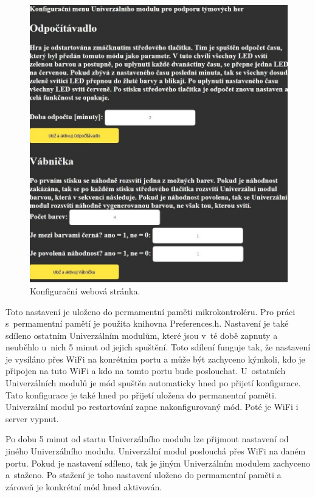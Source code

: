 \begin{figure}[!h]
  \begin{center}
    \includegraphics[scale=0.3]{obrazky/konfiguracni_webova_stranka.jpg}
  \end{center}
  \caption[Konfigurační webová stránka]{Konfigurační webová stránka.}
\end{figure}

Toto nastavení je uloženo do permamentní paměti mikrokontroléru. Pro práci s~permamentní pamětí je použita knihovna Preferences.h. Nastavení je také sdíleno ostatním Univerzálním modulům, které jsou v~té době zapnuty 
a neuběhlo u~nich 5 minut od jejich spuštění. Toto sdílení funguje tak, že nastavení je vysíláno přes WiFi na konrétním portu a může být zachyceno kýmkoli, kdo je připojen na tuto WiFi a kdo na tomto portu bude 
poslouchat. U~ostatních Univerzálních modulů je mód spuštěn automaticky hned po přijetí konfigurace. Tato konfigurace je také hned po přijetí uložena do permanentní paměti. Univerzální modul po restartování zapne 
nakonfigurovaný mód. Poté je WiFi i server vypnut. 

Po dobu 5 minut od startu Univerzálního modulu lze přijmout nastavení od jiného Univerzálního modulu. Univerzální modul poslouchá přes WiFi na daném portu. Pokud je nastavení sdíleno, tak je jiným Univerzálním modulem 
zachyceno a~staženo. Po stažení je toho nastavení uloženo do permamentní paměti a zároveň je konkrétní mód hned aktivován. 

